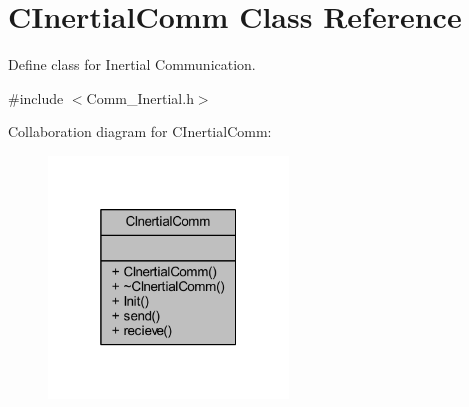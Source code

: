 \hypertarget{class_c_inertial_comm}{}\section{C\+Inertial\+Comm Class Reference}
\label{class_c_inertial_comm}


Define class for Inertial Communication.  




{\ttfamily \#include $<$Comm\+\_\+\+Inertial.\+h$>$}



Collaboration diagram for C\+Inertial\+Comm\+:
\nopagebreak
\begin{figure}[H]
\begin{center}
\leavevmode
\includegraphics[width=181pt]{class_c_inertial_comm__coll__graph}
\end{center}
\end{figure}
